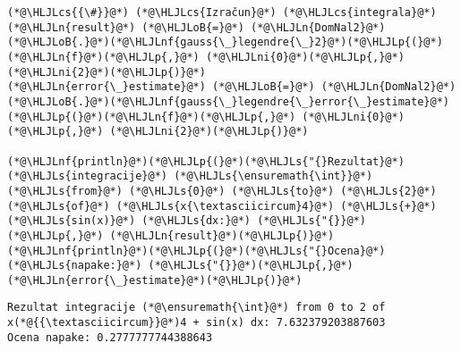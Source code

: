 \documentclass[12pt,a4paper]{article}
\newcommand{\HLJLn}[1]{#1}
\newcommand{\HLJLnf}[1]{\textcolor[RGB]{66,102,213}{#1}}
\newcommand{\HLJLs}[1]{\textcolor[RGB]{201,61,57}{#1}}
\newcommand{\HLJLni}[1]{\textcolor[RGB]{59,151,46}{#1}}
\newcommand{\HLJLoB}[1]{\textcolor[RGB]{102,102,102}{\textbf{#1}}}
\newcommand{\HLJLp}[1]{#1}
\newcommand{\HLJLcs}[1]{\textcolor[RGB]{153,153,119}{\textit{#1}}}
\begin{document}
\begin{lstlisting}
(*@\HLJLcs{{\#}}@*) (*@\HLJLcs{Izračun}@*) (*@\HLJLcs{integrala}@*)
(*@\HLJLn{result}@*) (*@\HLJLoB{=}@*) (*@\HLJLn{DomNal2}@*)(*@\HLJLoB{.}@*)(*@\HLJLnf{gauss{\_}legendre{\_}2}@*)(*@\HLJLp{(}@*)(*@\HLJLn{f}@*)(*@\HLJLp{,}@*) (*@\HLJLni{0}@*)(*@\HLJLp{,}@*) (*@\HLJLni{2}@*)(*@\HLJLp{)}@*)
(*@\HLJLn{error{\_}estimate}@*) (*@\HLJLoB{=}@*) (*@\HLJLn{DomNal2}@*)(*@\HLJLoB{.}@*)(*@\HLJLnf{gauss{\_}legendre{\_}error{\_}estimate}@*)(*@\HLJLp{(}@*)(*@\HLJLn{f}@*)(*@\HLJLp{,}@*) (*@\HLJLni{0}@*)(*@\HLJLp{,}@*) (*@\HLJLni{2}@*)(*@\HLJLp{)}@*)

(*@\HLJLnf{println}@*)(*@\HLJLp{(}@*)(*@\HLJLs{"{}Rezultat}@*) (*@\HLJLs{integracije}@*) (*@\HLJLs{\ensuremath{\int}}@*) (*@\HLJLs{from}@*) (*@\HLJLs{0}@*) (*@\HLJLs{to}@*) (*@\HLJLs{2}@*) (*@\HLJLs{of}@*) (*@\HLJLs{x{\textasciicircum}4}@*) (*@\HLJLs{+}@*) (*@\HLJLs{sin(x)}@*) (*@\HLJLs{dx:}@*) (*@\HLJLs{"{}}@*)(*@\HLJLp{,}@*) (*@\HLJLn{result}@*)(*@\HLJLp{)}@*)
(*@\HLJLnf{println}@*)(*@\HLJLp{(}@*)(*@\HLJLs{"{}Ocena}@*) (*@\HLJLs{napake:}@*) (*@\HLJLs{"{}}@*)(*@\HLJLp{,}@*) (*@\HLJLn{error{\_}estimate}@*)(*@\HLJLp{)}@*)
\end{lstlisting}

\begin{lstlisting}
Rezultat integracije (*@\ensuremath{\int}@*) from 0 to 2 of x(*@{{\textasciicircum}}@*)4 + sin(x) dx: 7.632379203887603
Ocena napake: 0.2777777744388643
\end{lstlisting}
\end{document}
